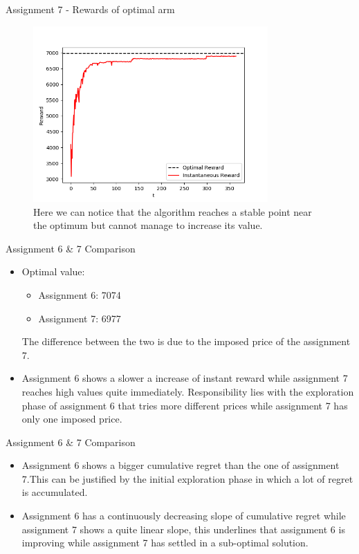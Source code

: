 \documentclass[11pt]{beamer}
\begin{document}
\begin{frame}{Assignment 7 - Rewards of optimal arm}
\begin{figure}[hbtp]
\centering
\includegraphics[width=0.8\textwidth]{images/assignment_7_regrets_arm_3_inst_reward.png}
\caption{Here we can notice that the algorithm reaches a stable point near the optimum but cannot manage to increase its value.}
\end{figure}
\end{frame}

\begin{frame}{Assignment 6 \& 7 Comparison}
	\begin{itemize}
		\item Optimal value:
		\begin{itemize}
			\item Assignment 6: 7074
			\item Assignment 7: 6977
		\end{itemize}
		The difference between the two is due to the imposed price of the assignment 7.
		\item Assignment 6 shows a slower a increase of instant reward while assignment 7 reaches high values quite immediately. Responsibility lies with the exploration phase of assignment 6 that tries more different prices while assignment 7 has only one imposed price.
	\end{itemize}
\end{frame}

\begin{frame}{Assignment 6 \& 7 Comparison}
	\begin{itemize}
		\item Assignment 6 shows a bigger cumulative regret than the one of assignment 7.This can be justified by the initial exploration phase in which a lot of regret is accumulated.
		\item Assignment 6 has a continuously decreasing slope of cumulative regret while assignment 7 shows a quite linear slope, this underlines that assignment 6 is improving while assignment 7 has settled in a sub-optimal solution.
	\end{itemize}
\end{frame}
\end{document}
